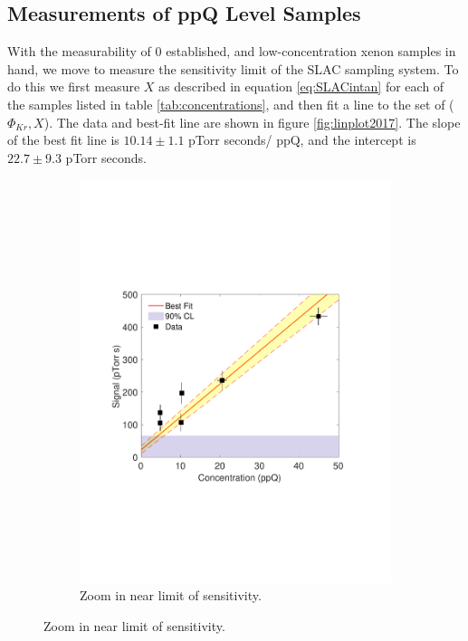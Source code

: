 \documentclass[12pt]{article}
\begin{document}
\subsection{Measurements of ppQ Level Samples}
With the measurability of 0 established, and low-concentration xenon samples in hand, we move to measure the sensitivity limit of the SLAC sampling system. To do this we first measure $X$ as described in equation \ref{eq:SLACintan} for each of the samples listed in table \ref{tab:concentrations}, and then fit a line to the set of ($\Phi_{Kr},X$). The data and best-fit line are shown in figure \ref{fig:linplot2017}. The slope of the best fit line is $10.14 \pm 1.1$ pTorr seconds/ ppQ, and the intercept is $22.7\pm 9.3$ pTorr seconds. 
\begin{figure}[h!]
\centering
\begin{subfigure}{0.5\textwidth}
  \centering
  \includegraphics[width=\textwidth]{Figures/SensPlot0217.pdf}
  \caption{Zoom in near limit of sensitivity.}
\end{subfigure}%

\end{figure}
\end{document}
